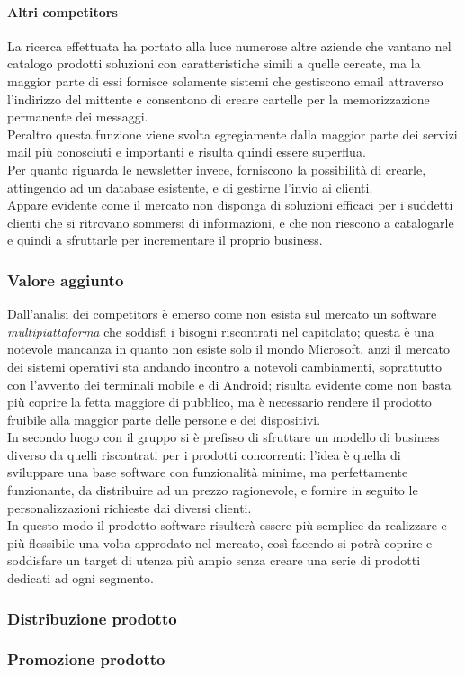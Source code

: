 \paragraph{Altri competitors}
La ricerca effettuata ha portato alla luce numerose altre aziende che vantano nel catalogo prodotti soluzioni con caratteristiche simili a quelle cercate, ma la maggior parte di essi fornisce solamente sistemi che gestiscono email attraverso l'indirizzo del mittente e consentono di creare cartelle per la memorizzazione permanente dei messaggi.\\
Peraltro questa funzione viene svolta egregiamente dalla maggior parte dei servizi mail più conosciuti e importanti e risulta quindi essere superflua.\\
Per quanto riguarda le newsletter invece, forniscono la possibilità di crearle, attingendo ad un database esistente, e di gestirne l'invio ai clienti.\\
Appare evidente come il mercato non disponga di soluzioni efficaci per i suddetti clienti che si ritrovano sommersi di informazioni, e che non riescono a catalogarle e quindi a sfruttarle per incrementare il proprio business.

\subsubsection{Valore aggiunto}
Dall'analisi dei competitors è emerso come non esista sul mercato un software \emph{multipiattaforma} che soddisfi i bisogni riscontrati nel capitolato; questa è una notevole mancanza in quanto non esiste solo il mondo Microsoft, anzi il mercato dei sistemi operativi sta andando incontro a notevoli cambiamenti, soprattutto con l'avvento dei terminali mobile e di Android; risulta evidente come non basta più coprire la fetta maggiore di pubblico, ma è necessario rendere il prodotto fruibile alla maggior parte delle persone e dei dispositivi.\\
In secondo luogo con \NOMEPROGETTO{} il gruppo si è prefisso di sfruttare un modello di business diverso da quelli riscontrati per i prodotti concorrenti: l'idea è quella di sviluppare una base software con funzionalità minime, ma perfettamente funzionante, da distribuire ad un prezzo ragionevole, e fornire in seguito le personalizzazioni richieste dai diversi clienti.\\
In questo modo il prodotto software risulterà essere più semplice da realizzare e più flessibile una volta approdato nel mercato, così facendo si potrà coprire e soddisfare un target di utenza più ampio senza creare una serie di prodotti dedicati ad ogni segmento.\\

\subsubsection{Distribuzione prodotto}

\subsubsection{Promozione prodotto}